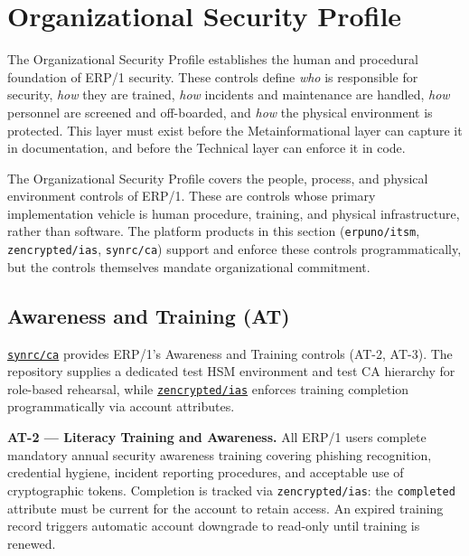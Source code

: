 \documentclass{article}
\begin{document}
\newpage
\section{Organizational Security Profile}


The Organizational Security Profile establishes the human and procedural foundation of ERP/1 security.
These controls define \textit{who} is responsible for security, \textit{how} they are trained,
\textit{how} incidents and maintenance are handled, \textit{how} personnel are screened and off-boarded,
and \textit{how} the physical environment is protected. This layer must exist before the Metainformational
layer can capture it in documentation, and before the Technical layer can enforce it in code.

The Organizational Security Profile covers the people, process, and physical environment controls of ERP/1.
These are controls whose primary implementation vehicle is human procedure, training, and physical infrastructure,
rather than software. The platform products in this section (\texttt{erpuno/itsm}, \texttt{zencrypted/ias},
\texttt{synrc/ca}) support and enforce these controls programmatically, but the controls themselves mandate
organizational commitment.

\subsection{Awareness and Training (AT)}

\href{https://github.com/synrc/ca}{\texttt{synrc/ca}} provides ERP/1's Awareness and Training controls (AT-2, AT-3). The repository supplies a dedicated test HSM environment and test CA hierarchy for role-based rehearsal, while \href{https://github.com/zencrypted/ias}{\texttt{zencrypted/ias}} enforces training completion programmatically via account attributes.

\textbf{AT-2 --- Literacy Training and Awareness.}
All ERP/1 users complete mandatory annual security awareness training covering phishing recognition, credential hygiene, incident reporting procedures, and acceptable use of cryptographic tokens. Completion is tracked via \texttt{zencrypted/ias}: the \texttt{completed} attribute must be current for the account to retain access. An expired training record triggers automatic account downgrade to read-only until training is renewed.
\end{document}
